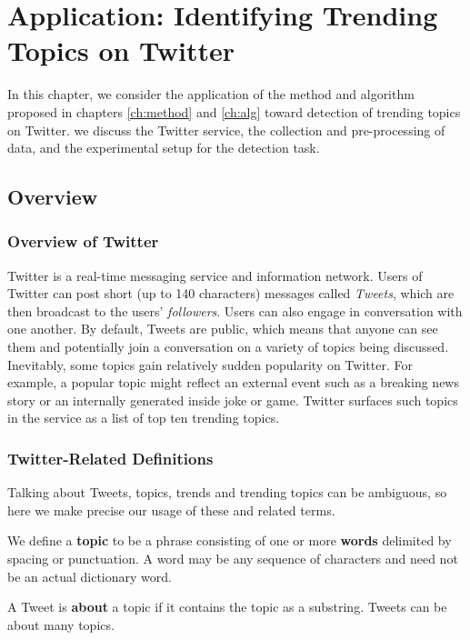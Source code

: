 \chapter{Application: Identifying Trending Topics on Twitter}
\label{ch:data}


In this chapter, we consider the application of the method and algorithm proposed
in chapters \ref{ch:method} and \ref{ch:alg} toward detection of trending topics
on Twitter. we discuss the Twitter service, the collection and pre-processing of
data, and the experimental setup for the detection task.

\section{Overview}
\subsection{Overview of Twitter}
Twitter is a real-time messaging service and information network. Users of
Twitter can post short (up to 140 characters) messages called {\em Tweets},
which are then broadcast to the users' {\em followers}. Users can also engage in
conversation with one another. By default, Tweets are public, which means that
anyone can see them and potentially join a conversation on a variety of topics
being discussed. Inevitably, some topics gain relatively sudden popularity on
Twitter. For example, a popular topic might reflect an external event such as a
breaking news story or an internally generated inside joke or game. Twitter
surfaces such topics in the service as a list of top ten trending topics. 

\subsection{Twitter-Related Definitions}
Talking about Tweets, topics, trends and trending topics can be ambiguous, so
here we make precise our usage of these and related terms.

\begin{defn}[Topic]
  We define a {\bf topic} to be a phrase consisting of one or more {\bf words}
  delimited by spacing or punctuation. A word may be any sequence of characters
  and need not be an actual dictionary word.
\end{defn}

\begin{defn}
A Tweet is {\bf about} a topic if it contains the topic as a substring. Tweets
can be about many topics.
\end{defn}

